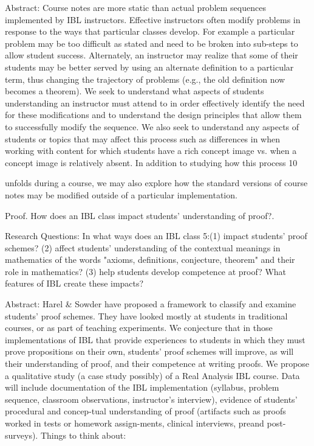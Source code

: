 \documentclass[11pt]{article}
\begin{document}
Abstract: Course notes are more static than actual problem sequences implemented by IBL instructors. Effective instructors often modify problems in response to the ways that particular classes develop. For example a particular problem may be too difficult as stated and need to be broken into sub-steps to allow student success. Alternately, an instructor may realize that some of their students may be better served by using an alternate definition to a particular term, thus changing the trajectory of problems (e.g., the old definition now becomes a theorem). We seek to understand what aspects of students understanding an instructor must attend to in order effectively identify the need for these modifications and to understand the design principles that allow them to successfully modify the sequence. We also seek to understand any aspects of students or topics that may affect this process such as differences in when working with content for which students have a rich concept image vs. when a concept image is relatively absent. In addition to studying how this process 10

unfolds during a course, we may also explore how the standard versions of course notes may be modified outside of a particular implementation.

Proof. How does an IBL class impact students' understanding of proof?.

Research Questions: In what ways does an IBL class 5:(1) impact students' proof schemes? (2) affect students' understanding of the contextual meanings in mathematics of the words "axioms, definitions, conjecture, theorem" and their role in mathematics? (3) help students develop competence at proof? What features of IBL create these impacts?

Abstract: Harel \& Sowder have proposed a framework to classify and examine students' proof schemes. They have looked mostly at students in traditional courses, or as part of teaching experiments. We conjecture that in those implementations of IBL that provide experiences to students in which they must prove propositions on their own, students' proof schemes will improve, as will their understanding of proof, and their competence at writing proofs. We propose a qualitative study (a case study possibly) of a Real Analysis IBL course. Data will include documentation of the IBL implementation (syllabus, problem sequence, classroom observations, instructor's interview), evidence of students' procedural and concep-tual understanding of proof (artifacts such as proofs worked in tests or homework assign-ments, clinical interviews, preand post-surveys). Things to think about:
\end{document}
